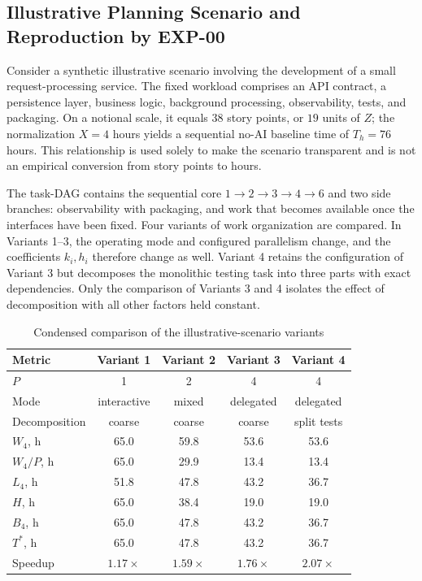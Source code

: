 \subsection{Illustrative Planning Scenario and Reproduction by EXP-00}
\label{sec:practical-example}

Consider a synthetic illustrative scenario involving the development of a small
request-processing service. The fixed workload comprises an API contract, a
persistence layer, business logic, background processing, observability, tests,
and packaging. On a notional scale, it equals $38$ story points, or $19$ units
of $Z$; the normalization $X=4$ hours yields a sequential no-AI baseline time of
$T_h=76$ hours. This relationship is used solely to make the scenario
transparent and is not an empirical conversion from story points to hours.

The task-DAG contains the sequential core
$1\to2\to3\to4\to6$ and two side branches: observability with packaging, and
work that becomes available once the interfaces have been fixed. Four variants
of work organization are compared. In Variants 1--3, the operating mode and
configured parallelism change, and the coefficients $k_i,h_i$ therefore change
as well. Variant 4 retains the configuration of Variant 3 but decomposes the
monolithic testing task into three parts with exact dependencies. Only the
comparison of Variants 3 and 4 isolates the effect of decomposition with all
other factors held constant.

\begin{table}[ht]
\centering
\caption{Condensed comparison of the illustrative-scenario variants}
\label{tab:compact-practical}
\begin{tabular}{lcccc}
\toprule
Metric & Variant 1 & Variant 2 & Variant 3 & Variant 4 \\
\midrule
$P$ & 1 & 2 & 4 & 4 \\
Mode & interactive & mixed & delegated & delegated \\
Decomposition & coarse & coarse & coarse & split tests \\
$W_4$, h & 65.0 & 59.8 & 53.6 & 53.6 \\
$W_4/P$, h & 65.0 & 29.9 & 13.4 & 13.4 \\
$L_4$, h & 51.8 & 47.8 & 43.2 & 36.7 \\
$H$, h & 65.0 & 38.4 & 19.0 & 19.0 \\
$B_4$, h & 65.0 & 47.8 & 43.2 & 36.7 \\
$T^*$, h & 65.0 & 47.8 & 43.2 & 36.7 \\
Speedup & $1.17\times$ & $1.59\times$ & $1.76\times$ & $2.07\times$ \\
\bottomrule
\end{tabular}
\end{table}


